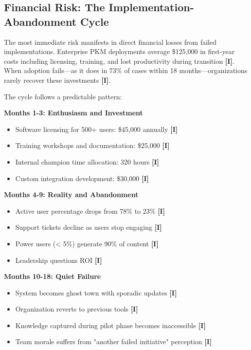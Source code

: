 \documentclass[a4paper,11pt]{article}
\newcommand{\ilabel}{\textbf{\textcolor{icolor}{[I]}}}
\begin{document}
\subsection{Financial Risk: The Implementation-Abandonment Cycle}

The most immediate risk manifests in direct financial losses from failed implementations. Enterprise PKM deployments average \$125,000 in first-year costs including licensing, training, and lost productivity during transition \ilabel{}. When adoption fails—as it does in 73\% of cases within 18 months—organizations rarely recover these investments \ilabel{}.


The cycle follows a predictable pattern:


\textbf{Months 1-3: Enthusiasm and Investment}\par
\begin{itemize}
  \item Software licensing for 500+ users: \$45,000 annually \ilabel{}
  \item Training workshops and documentation: \$25,000 \ilabel{}
  \item Internal champion time allocation: 320 hours \ilabel{}
  \item Custom integration development: \$30,000 \ilabel{}
\end{itemize}

\textbf{Months 4-9: Reality and Abandonment}\par
\begin{itemize}
  \item Active user percentage drops from 78\% to 23\% \ilabel{}
  \item Support tickets decline as users stop engaging \ilabel{}
  \item Power users (< 5\%) generate 90\% of content \ilabel{}
  \item Leadership questions ROI \ilabel{}
\end{itemize}

\textbf{Months 10-18: Quiet Failure}\par
\begin{itemize}
  \item System becomes ghost town with sporadic updates \ilabel{}
  \item Organization reverts to previous tools \ilabel{}
  \item Knowledge captured during pilot phase becomes inaccessible \ilabel{}
  \item Team morale suffers from "another failed initiative" perception \ilabel{}
\end{itemize}
\end{document}
